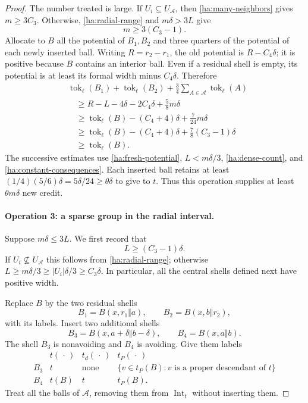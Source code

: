 \documentclass[11pt]{amsart}
\theoremstyle{definition}
\theoremstyle{remark}
\numberwithin{equation}{section}
\begin{document}
\begin{proof}
The number treated is large.  If $U_i\subseteq U_{\mathcal A}$, then
\eqref{ha:many-neighbors} gives $m\geq3C_3$.  Otherwise,
\eqref{ha:radial-range} and $m\delta>3L$ give
\begin{equation}
 m\geq3(C_3-1).
 \label{ha:dense-count}
\end{equation}
Allocate to $B$ all the potential of $B_1,B_2$ and three quarters of
the potential of each newly inserted ball.  Writing $R=r_2-r_1$,
the old potential is $R-C_4\delta$; it is positive because $B$
contains an interior ball.  Even if a residual shell is empty, its
potential is at least its formal width minus $C_4\delta$.  Therefore
\begin{align*}
 &\operatorname{tok}_\ell(B_1)+\operatorname{tok}_\ell(B_2)
       +\frac34\sum_{A\in\mathcal A}\operatorname{tok}_\ell(A)\\
 &\quad\geq R-L-4\delta-2C_4\delta+\frac58m\delta\\
 &\quad\geq\operatorname{tok}_\ell(B)
                -(C_4+4)\delta+\frac7{24}m\delta\\
 &\quad\geq\operatorname{tok}_\ell(B)
                -(C_4+4)\delta+\frac78(C_3-1)\delta\\
 &\quad\geq\operatorname{tok}_\ell(B).
\end{align*}
The successive estimates use \eqref{ha:fresh-potential},
$L<m\delta/3$, \eqref{ha:dense-count}, and
\eqref{ha:constant-consequences}.  Each inserted ball retains at least
$(1/4)(5/6)\delta=5\delta/24\geq\theta\delta$ to give to $t$.
Thus this operation supplies at least $\theta m\delta$ new credit.

\paragraph{\textbf{Operation 3: a sparse group in the radial interval.}}
Suppose $m\delta\leq3L$.  We first record that
\begin{equation}
 L\geq(C_3-1)\delta.
 \label{ha:sparse-width}
\end{equation}
If $U_i\not\subseteq U_{\mathcal A}$ this follows from
\eqref{ha:radial-range}; otherwise
$L\geq m\delta/3\geq|U_i|\delta/3\geq C_3\delta$.
In particular, all the central shells defined next have positive width.

Replace $B$ by the two residual shells
\[
 B_1=B(x,r_1\Vert a),\qquad B_2=B(x,b\Vert r_2),
\]
with its labels.  Insert two additional shells
\[
 B_3=B(x,a+\delta\Vert b-\delta),\qquad
 B_4=B(x,a\Vert b).
\]
The shell $B_3$ is nonavoiding and $B_4$ is avoiding.  Give them labels
\begin{equation}
 \begin{array}{c|ccc}
    &t(\,\cdot\,)&t_d(\,\cdot\,)&t_P(\,\cdot\,)\\ \hline
 B_3&t&\text{none}&
             \{v\in t_P(B):v\text{ is a proper descendant of }t\}\\
 B_4&t(B)&t&t_P(B).
 \end{array}
 \label{ha:central-labels}
\end{equation}
Treat all the balls of $\mathcal A$, removing them from
$\operatorname{Int}_t$ without inserting them.


\end{proof}
\end{document}
